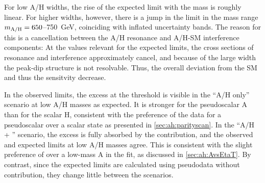 For low A/H widths, the rise of the expected limit with the mass is roughly linear. For higher widths, however, there is a jump in the limit in the mass range $m_{\mathrm{A/H}} = 650$--\SI{750}{\GeV}, coinciding with inflated uncertainty bands. The reason for this is a cancellation between the A/H resonance and A/H-SM interference components: At the \gAHtt values relevant for the expected limits, the cross sections of resonance and interference approximately cancel, and because of the large width the peak-dip structure is not resolvable. Thus, the overall deviation from the SM and thus the sensitvity decrease. 

In the observed limits, the excess at the \ttbar threshold is visible in the ``A/H only'' scenario at low A/H masses as expected. It is stronger for the pseudoscalar A than for the scalar H, consistent with the preference of the data for a pseudoscalar over a scalar \ttbar state as presented in \cref{sec:ah:parityscan}. 
In the ``A/H + \etat'' scenario, the excess is fully absorbed by the \etat contribution, and the observed and expected limits at low A/H masses agree. This is consistent with the slight preference of \etat over a low-mass A in the fit, as discussed in \cref{sec:ah:AvsEtaT}.
By contrast, since the expected limits are calculated using pseudodata without \etat contribution, they change little between the scenarios.



